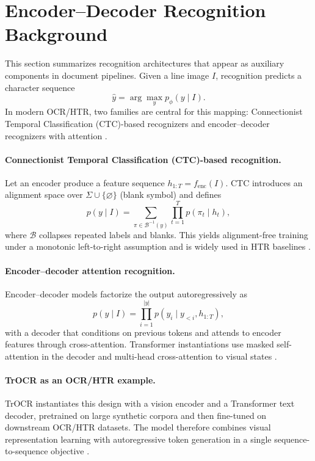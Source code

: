 
\section{Encoder--Decoder Recognition Background}
\label{sec:theory_encoder_decoder}

This section summarizes recognition architectures that appear as auxiliary components in document pipelines. Given a line image $I$, recognition predicts a character sequence
\[
\hat{y}=\arg\max_{y} p_\phi(y\mid I).
\]
In modern OCR/HTR, two families are central for this mapping: Connectionist Temporal Classification (CTC)-based recognizers and encoder--decoder recognizers with attention .

\paragraph{Connectionist Temporal Classification (CTC)-based recognition.}
Let an encoder produce a feature sequence $h_{1:T}=f_{\text{enc}}(I)$. CTC introduces an alignment space over $\Sigma\cup\{\varnothing\}$ (blank symbol) and defines
\begin{equation}
p(y\mid I)=\sum_{\pi\in\mathcal{B}^{-1}(y)}\prod_{t=1}^{T} p(\pi_t\mid h_t),
\label{eq:ctc_objective}
\end{equation}
where $\mathcal{B}$ collapses repeated labels and blanks. This yields alignment-free training under a monotonic left-to-right assumption and is widely used in HTR baselines .

\paragraph{Encoder--decoder attention recognition.}
Encoder--decoder models factorize the output autoregressively as
\begin{equation}
p(y\mid I)=\prod_{i=1}^{|y|} p(y_i\mid y_{<i},h_{1:T}),
\label{eq:enc_dec_objective}
\end{equation}
with a decoder that conditions on previous tokens and attends to encoder features through cross-attention. Transformer instantiations use masked self-attention in the decoder and multi-head cross-attention to visual states .

\paragraph{TrOCR as an OCR/HTR example.}
TrOCR instantiates this design with a vision encoder and a Transformer text decoder, pretrained on large synthetic corpora and then fine-tuned on downstream OCR/HTR datasets. The model therefore combines visual representation learning with autoregressive token generation in a single sequence-to-sequence objective .

